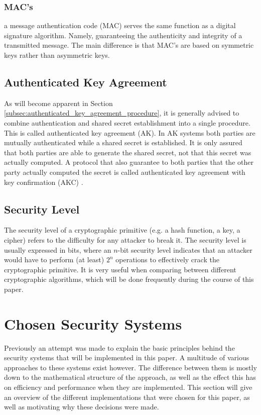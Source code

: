 \subsubsection{MAC's} 
\label{subsec:MAC}
a message authentication code (MAC) serves the same function as a digital signature algorithm. Namely, guaranteeing the authenticity and integrity of a transmitted message. The main difference is that MAC's are based on symmetric keys rather than asymmetric keys. 

\subsection{Authenticated Key Agreement}
\label{sec:AK}

As will become apparent in Section \ref{subsec:authenticated_key_agreement_procedure}, it is generally advised to combine authentication and shared secret establishment into a single procedure. This is called authenticated key agreement (AK). In AK systems both parties are mutually authenticated while a shared secret is established. It is only assured that both parties are able to generate the shared secret, not that this secret was actually computed. A protocol that also guarantee to both parties that the other party actually computed the secret is called authenticated key agreement with key confirmation (AKC) \cite{Blake-Wilson}.

\subsection{Security Level}
\label{sec:security_level}

The security level of a cryptographic primitive (e.g. a hash function, a key, a cipher) refers to the difficulty for any attacker to break it. The security level is usually expressed in bits, where  an $n$-bit security level indicates that an attacker would have to perform (at least) $2^n$ operations to effectively crack the cryptographic primitive. It is very useful when comparing between different cryptographic algorithms, which will be done frequently during the course of this paper.

\section{Chosen Security Systems}
Previously an attempt was made to explain the basic principles behind the security systems that will be implemented in this paper. A multitude of various approaches to these systems exist however. The difference between them is mostly down to the mathematical structure of the approach, as well as the effect this has on efficiency and performance when they are implemented. This section will give an overview of the different implementations that were chosen for this paper, as well as motivating why these decisions were made.

